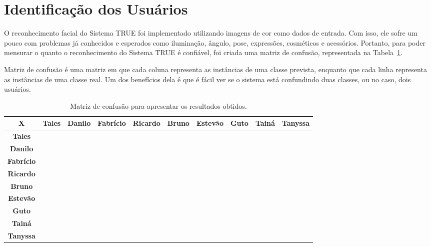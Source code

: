 \section{Identificação dos Usuários}
	 
	O reconhecimento facial do Sistema TRUE foi implementado utilizando imagens de cor como dados de entrada. Com isso, ele sofre um pouco com problemas já conhecidos e esperados como iluminação, ângulo, pose, expressões, cosméticos e acessórios. Portanto, para poder mensurar o quanto o reconhecimento do Sistema TRUE é confiável, foi criada uma matriz de confusão, representada na Tabela~\ref{tab:matriz-confusao}.

	Matriz de confusão é uma matriz em que cada coluna representa as instâncias de uma classe prevista, enquanto que cada linha representa as instâncias de uma classe real. Um dos benefícios dela é que é fácil ver se o sistema está confundindo duas classes, ou no caso, dois usuários.
	

	\begin{table}[H]
		\begin{center}
			\caption{Matriz de confusão para apresentar os resultados obtidos.}
			\begin{tabular}{|c|c|c|c|c|c|c|c|c|c|}
				\hline \bf X & \bf Tales & \bf Danilo & \bf Fabrício & \bf Ricardo & \bf
				Bruno & \bf Estevão & \bf Guto & \bf Tainá & \bf Tanyssa \\
				\hline \bf Tales & & & & & & & & & \\
				\hline \bf Danilo & & & & & & & & & \\
				\hline \bf Fabrício & & & & & & & & & \\
				\hline \bf Ricardo & & & & & & & & & \\
				\hline \bf Bruno & & & & & & & & & \\
				\hline \bf Estevão & & & & & & & & & \\
				\hline \bf Guto & & & & & & & & & \\
				\hline \bf Tainá & & & & & & & & & \\
				\hline \bf Tanyssa & & & & & & & & & \\
				\hline
			\end{tabular}
		\end{center}
		\label{tab:matriz-confusao}
	\end{table}
